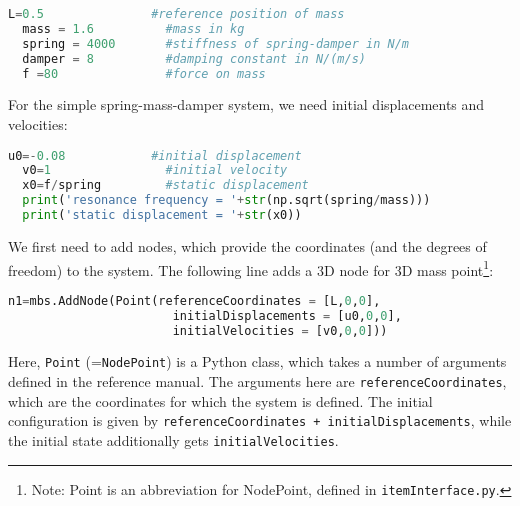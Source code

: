 \begin{lstlisting}[language=Python, firstnumber=9]
  L=0.5               #reference position of mass
  mass = 1.6          #mass in kg
  spring = 4000       #stiffness of spring-damper in N/m
  damper = 8          #damping constant in N/(m/s)
  f =80               #force on mass
\end{lstlisting}
%
For the simple spring-mass-damper system, we need initial displacements and velocities:
\begin{lstlisting}[language=Python, firstnumber=14]
  u0=-0.08            #initial displacement
  v0=1                #initial velocity
  x0=f/spring         #static displacement
  print('resonance frequency = '+str(np.sqrt(spring/mass)))
  print('static displacement = '+str(x0))
\end{lstlisting}
%
We first need to add nodes, which provide the coordinates (and the degrees of freedom) to the system.
The following line adds a 3D node for 3D mass point\footnote{Note: Point is an abbreviation for NodePoint, defined in \texttt{itemInterface.py}.}:
\begin{lstlisting}[language=Python, firstnumber=19]
  n1=mbs.AddNode(Point(referenceCoordinates = [L,0,0], 
                       initialDisplacements = [u0,0,0], 
                       initialVelocities = [v0,0,0]))
\end{lstlisting}
Here, \texttt{Point} (=\texttt{NodePoint}) is a Python class, which takes a number of arguments defined in the reference manual. The arguments here are \texttt{referenceCoordinates}, which are the coordinates for which the system is defined. The initial configuration is given by \texttt{referenceCoordinates + initialDisplacements}, while the initial state additionally gets \texttt{initialVelocities}.

